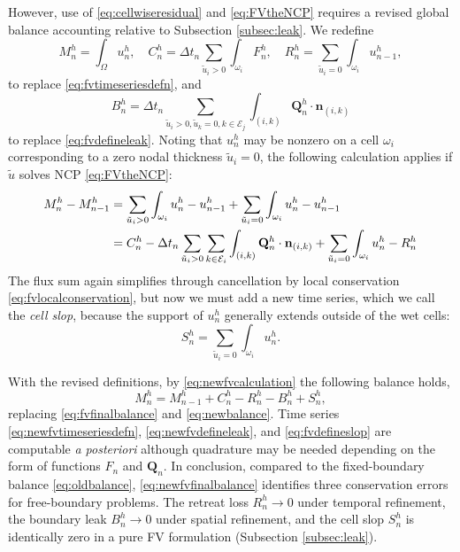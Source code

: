 \documentclass[final,onefignum]{siamart190516}
\newcommand\bn{\mathbf{n}}
\newcommand\bQ{\mathbf{Q}}
\begin{document}
However, use of \eqref{eq:cellwiseresidual} and \eqref{eq:FVtheNCP} requires a revised global balance accounting relative to Subsection \ref{subsec:leak}.  We redefine
\begin{equation}
M_n^h = \int_\Omega u_n^h, \quad C_n^h = \Delta t_n \sum_{\tilde u_i>0} \int_{\omega_i} F_n^h, \quad R_n^h = \sum_{\tilde u_i=0} \int_{\omega_i} u_{n-1}^h, \label{eq:newfvtimeseriesdefn}
\end{equation}
to replace \eqref{eq:fvtimeseriesdefn}, and
\begin{equation}
B_n^h = \Delta t_n \sum_{\tilde u_i > 0, \tilde u_k = 0, k\in\mathcal{E}_j} \int_{(i,k)} \bQ_n^h \cdot \bn_{(i,k)} \label{eq:newfvdefineleak}
\end{equation}
to replace \eqref{eq:fvdefineleak}.  Noting that $u_n^h$ may be nonzero on a cell $\omega_i$ corresponding to a zero nodal thickness $\tilde u_i=0$, the following calculation applies if $\tilde u$ solves NCP \eqref{eq:FVtheNCP}:
\begin{align}
M_n^h - M_{n-1}^h &= \sum_{\tilde u_i>0} \int_{\omega_i} u_n^h - u_{n-1}^h + \sum_{\tilde u_i=0} \int_{\omega_i} u_n^h - u_{n-1}^h \label{eq:newfvcalculation} \\
  &= C_n^h - \Delta t_n \sum_{\tilde u_i>0} \sum_{k\in \mathcal{E}_i} \int_{(i,k)} \bQ_n^h \cdot \bn_{(i,k)} + \sum_{\tilde u_i=0} \int_{\omega_i} u_n^h - R_n^h \notag
\end{align}
The flux sum again simplifies through cancellation by local conservation \eqref{eq:fvlocalconservation}, but now we must add a new time series, which we call the \emph{cell slop}, because the support of $u_n^h$ generally extends outside of the wet cells:
\begin{equation}
S_n^h = \sum_{\tilde u_i=0} \int_{\omega_i} u_n^h. \label{eq:fvdefineslop}
\end{equation}

With the revised definitions, by \eqref{eq:newfvcalculation} the following balance holds,
\begin{equation}
  M_n^h = M_{n-1}^h + C_n^h - R_n^h - B_n^h + S_n^h, \label{eq:newfvfinalbalance}
\end{equation}
replacing \eqref{eq:fvfinalbalance} and \eqref{eq:newbalance}.  Time series \eqref{eq:newfvtimeseriesdefn}, \eqref{eq:newfvdefineleak}, and \eqref{eq:fvdefineslop} are computable \emph{a posteriori} although quadrature may be needed depending on the form of functions $F_n$ and $\bQ_n$.  In conclusion, compared to the fixed-boundary balance \eqref{eq:oldbalance}, \eqref{eq:newfvfinalbalance} identifies three conservation errors for free-boundary problems.  The retreat loss $R_n^h\to 0$ under temporal refinement, the boundary leak $B_n^h\to 0$ under spatial refinement, and the cell slop $S_n^h$ is identically zero in a pure FV formulation (Subsection \ref{subsec:leak}).
\end{document}
